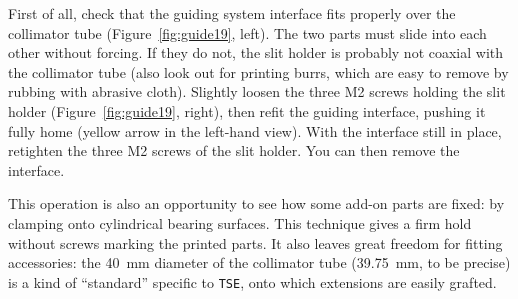 \documentclass[11pt,a4paper]{article}
\begin{document}
%
First of all, check that the guiding system interface fits properly over the collimator tube (Figure~\ref{fig:guide19}, left). The two parts must slide into each other without forcing. If they do not, the slit holder is probably not coaxial with the collimator tube (also look out for printing burrs, which are easy to remove by rubbing with abrasive cloth). Slightly loosen the three M2 screws holding the slit holder (Figure~\ref{fig:guide19}, right), then refit the guiding interface, pushing it fully home (yellow arrow in the left-hand view). With the interface still in place, retighten the three M2 screws of the slit holder. You can then remove the interface.

This operation is also an opportunity to see how some add-on parts are fixed: by clamping onto cylindrical bearing surfaces. This technique gives a firm hold without screws marking the printed parts. It also leaves great freedom for fitting accessories: the 40~mm diameter of the collimator tube (39.75~mm, to be precise) is a kind of \enquote{standard} specific to \texttt{TSE}, onto which extensions are easily grafted.
\end{document}
